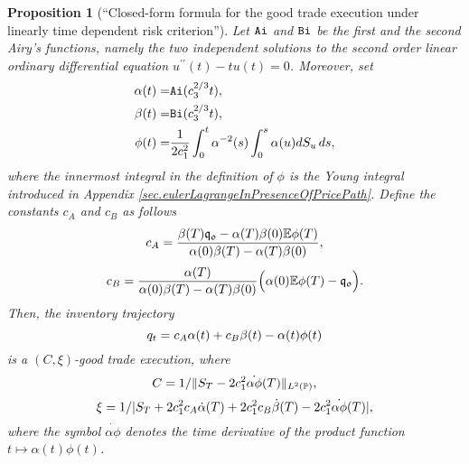 \documentclass[10pt,a4paper]{article}
\newtheorem{prop}[thm]{Proposition}
\begin{document}
	\begin{prop}[``Closed-form formula for the good trade execution under linearly time dependent risk criterion'']\label{prop.goodTradeExecutionTimeIC}
		Let $\mathtt{Ai}$ and $\mathtt{Bi}$ be the first and the second Airy's functions, namely the two independent solutions to the second order linear ordinary differential equation $u^{\prime \prime}(t) - tu(t) = 0$. Moreover, set
		\begin{equation*}
		\begin{split}
		\alpha(t) =& \mathtt{Ai}(c_{3}^{2/3} t),\\
		\beta(t) =& \mathtt{Bi}(c_{3}^{2/3} t), \\
		\phi(t) =& \frac{1}{2c_{1}^{2}}\int_{0}^{t} \alpha^{-2}(s)\int_{0}^{s}\alpha(u)dS_u \,ds,
		\end{split}
		\end{equation*}
		where the innermost integral in the definition of $\phi$ is the Young integral introduced in Appendix \ref{sec.eulerLagrangeInPresenceOfPricePath}.
		Define the constants $c_A$ and $c_B$ as follows
		\begin{equation*}
		c_A = \frac{\beta(T)\mathfrak{q_0} - \alpha(T)\beta(0)\mathbb{{E}}\phi(T)}
		{\alpha(0)\beta(T) - \alpha(T)\beta(0)},
		\end{equation*}
			\begin{equation*}
		c_B = \frac{ \alpha(T)}
		{\alpha(0)\beta(T) - \alpha(T)\beta(0)}\Big(\alpha(0)\mathbb{{E}}\phi(T) - \mathfrak{q_0}\Big).
		\end{equation*}
		Then, the inventory trajectory 
		\begin{equation}\label{eq.goodTradeExecutionTimeIC}
		q_t = c_A \alpha(t) + c_B\beta(t) - \alpha(t) \phi(t)
		\end{equation}
		is a $(C,\xi)$-good trade execution, where
		\begin{equation*}
		C=1/
		\lVert 
		S_{T} - 2c_{1}^{2} \dot{\alpha \phi}(T) 
		\rVert_{L^{2}({\mathbb{P}})},
		\end{equation*}
		\begin{equation*}
		\xi=1/
		\lvert 
		S_{T} 
		+2c_{1}^{2} c_A\dot{\alpha}(T)
		+2c_{1}^{2} c_B \dot{\beta}(T)
		-2c_{1}^{2} \dot{\alpha \phi}(T)
		\rvert,
		\end{equation*}
		where the symbol $ \dot{\alpha \phi}$ denotes the time derivative of the product function $t\mapsto\alpha(t)\phi(t)$. 
	\end{prop}
\end{document}
